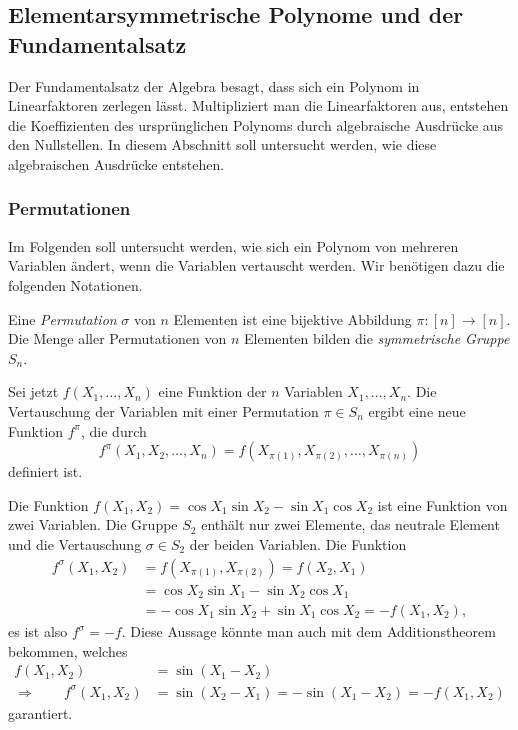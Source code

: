 %
%
%
\subsection{Elementarsymmetrische Polynome und der Fundamentalsatz
\label{buch:komplex:symmetrisch:subsection:fundamentalsatz}}
Der Fundamentalsatz der Algebra besagt, dass sich ein Polynom in
Linearfaktoren zerlegen lässt.
Multipliziert man die Linearfaktoren aus, entstehen die Koeffizienten
des ursprünglichen Polynoms durch algebraische Ausdrücke aus den
Nullstellen.
In diesem Abschnitt soll untersucht werden, wie diese algebraischen
Ausdrücke entstehen.

%
%
\subsubsection{Permutationen}
Im Folgenden soll untersucht werden, wie sich ein Polynom von mehreren
Variablen ändert, wenn die Variablen vertauscht werden.
Wir benötigen dazu die folgenden Notationen.

\begin{definition}[Permutation]
Eine \emph{Permutation} $\sigma$ von $n$ Elementen ist eine bijektive Abbildung
%
$\pi\colon [n]\to[n]$.
Die Menge aller Permutationen von $n$ Elementen bilden die
\emph{symmetrische Gruppe} $S_n$.
%
%
%
\end{definition}

Sei jetzt $f(X_1,\dots,X_n)$ eine Funktion der $n$ Variablen 
$X_1,\dots,X_n$.
Die Vertauschung der Variablen mit einer Permutation $\pi\in S_n$
ergibt eine neue Funktion $f^\pi$, die durch
\[
f^\pi(X_1,X_2,\dots,X_n)
=
f(X_{\pi(1)},X_{\pi(2)},\dots,X_{\pi(n)})
\]
definiert ist.

\begin{beispiel}
Die Funktion $f(X_1,X_2) = \cos X_1\sin X_2 - \sin X_1\cos X_2$ ist eine
Funktion von zwei Variablen.
Die Gruppe $S_2$ enthält nur zwei Elemente, das neutrale Element und
die Vertauschung $\sigma\in S_2$ der beiden Variablen.
Die Funktion
\begin{align*}
f^\sigma(X_1,X_2)
&=
f(X_{\pi(1)},X_{\pi(2)})
=
f(X_2,X_1)
\\
&=
\cos X_2\sin X_1 - \sin X_2\cos X_1
\\
&=
-\cos X_1\sin X_2 + \sin X_1\cos X_2
=
-f(X_1,X_2),
\end{align*}
es ist also $f^\sigma=-f$.
Diese Aussage könnte man auch mit dem Additionstheorem bekommen, welches
%
\begin{align*}
f(X_1,X_2)&=\sin(X_1-X_2)
\\
\Rightarrow\qquad
f^\sigma(X_1,X_2)
&=
\sin(X_2-X_1)
=
-\sin(X_1-X_2)
=
-f(X_1,X_2)
\end{align*}
garantiert.
\end{beispiel}

